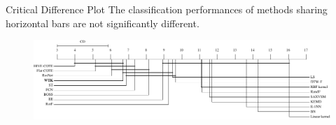 \begin{frame}{Critical Difference Plot}
    The classification performances of methods sharing horizontal bars are not significantly different.
    \begin{figure}
      \centering
      \includegraphics[width=\linewidth]{figures/CD_new.pdf}
    \end{figure}
\end{frame}